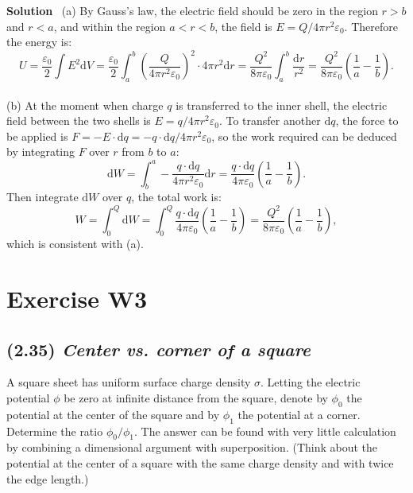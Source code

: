 \documentclass[hidelinks]{article}
\begin{document}
\vspace{0.5cm}
\noindent
\textbf{Solution} \, (a) By Gauss's law, the electric field should be zero in the region $r>b$ and $r<a$, and within the region $a<r<b$, the field is $E=Q/4\pi r^2 \varepsilon_0$. Therefore the energy is:
$$U = \frac{\varepsilon_0}{2} \int E^2\mathrm{d}V= \frac{\varepsilon_0}{2} \int_a^b \left( \frac{Q}{4\pi r^2 \varepsilon_0} \right)^2 \cdot 4\pi r^2 \mathrm{d}r = \frac{Q^2}{8\pi \varepsilon_0} \int_a^b \frac{\mathrm{d}r}{r^2} = \frac{Q^2}{8\pi \varepsilon_0} \left(\frac{1}{a} - \frac{1}{b}\right).$$\\[3mm]
(b) At the moment when charge $q$ is transferred to the inner shell, the electric field between the two shells is $E = q/4\pi r^2 \varepsilon_0$. To transfer another $\mathrm{d}q$, the force to be applied is $F = -E \cdot \mathrm{d}q = -q \cdot \mathrm{d}q/4\pi r^2 \varepsilon_0$, so the work required can be deduced by integrating $F$ over $r$ from $b$ to $a$:
$$\mathrm{d}W = \int _b^a -\frac{q \cdot \mathrm{d}q}{4\pi r^2 \varepsilon_0} \mathrm{d}r = \frac{q\cdot \mathrm{d}q}{4\pi \varepsilon_0} \left(\frac{1}{a}-\frac{1}{b} \right).$$
Then integrate $\mathrm{d}W$ over $q$, the total work is:
$$W = \int_0^Q \mathrm{d}W = \int_0^Q \frac{q\cdot \mathrm{d}q}{4\pi \varepsilon_0} \left(\frac{1}{a}-\frac{1}{b} \right) = \frac{Q^2}{8\pi \varepsilon_0} \left(\frac{1}{a} - \frac{1}{b}\right),$$
which is consistent with (a).

\pagebreak
\section{Exercise W3}
\subsection{(2.35) \textit{Center vs. corner of a square}} 
A square sheet has uniform surface charge density $\sigma$. Letting the electric potential $\phi$ be zero at infinite distance from the square, denote by $\phi_0$ the potential at the center of the square and by $\phi_1$ the potential at a corner. Determine the ratio $\phi_0/\phi_1$. The answer can be found with very little calculation by combining a dimensional argument with superposition. (Think about the potential at the center of a square with the same charge density and with twice the edge length.)
\end{document}
